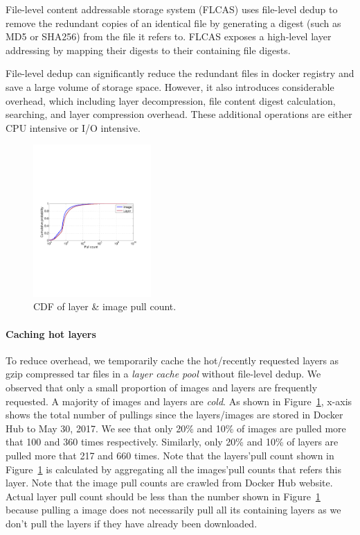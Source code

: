 File-level content addressable storage system (FLCAS) uses file-level dedup to remove the redundant copies of an identical file by generating a digest (such as MD5 or SHA256) from the file it refers to. FLCAS exposes a high-level layer addressing by mapping their digests to their containing file digests.     

File-level dedup can significantly reduce the redundant files in docker registry and save a large volume of storage space. However, it also introduces considerable overhead, which including layer decompression, file content digest calculation, searching, and layer compression overhead. These additional operations are either CPU intensive or I/O intensive.  

\begin{figure}
	\centering
	\includegraphics[width=0.4\textwidth]{graphs/pull-cnt.pdf}
	\caption{CDF of layer \& image pull count.
	}
	\label{fig:pull-cnt}
\end{figure}

\paragraph{Caching hot layers}To reduce overhead, we temporarily cache the hot/recently requested layers as gzip compressed tar files in a \textit{layer cache pool} without file-level dedup.
We observed that only a small proportion of images and layers are frequently requested. A majority of images and layers are \textit{cold}.
As shown in Figure~\ref{fig:pull-cnt}, x-axis shows the total number of pullings since the layers/images are stored in Docker Hub to May 30, 2017. 
We see that only 20\% and 10\% of images are pulled more that 100 and 360 times respectively. 
Similarly, only 20\% and 10\% of layers are pulled more that 217 and 660 times. 
Note that 
the layers'pull count shown in Figure~\ref{fig:pull-cnt} is calculated by aggregating all the images'pull counts that refers this layer.
Note that the image pull counts are crawled from Docker Hub website. 
Actual layer pull count should be less than the number shown in Figure~\ref{fig:pull-cnt} because pulling a image does not necessarily pull all its containing layers as we don't pull the layers if they have already been downloaded.
 
